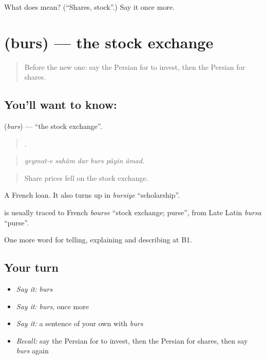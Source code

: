 \begin{tcolorbox}[breakable,colback=teal!4,colframe=teal!35!black,title={Before you move on}]
What does  mean? (\textquotedblleft{}Shares, stock\textquotedblright{}.) Say it once more.
\end{tcolorbox}
\section[\texorpdfstring{\fa{بورس} (burs)}{بورس (burs)}]{ (burs) — the stock exchange}

\label{lesson:FA-C412-burs}



\begin{quote}
Before the new one: say the Persian for to invest, then the Persian for shares.
\end{quote}

\subsection*{You'll want to know: }
\textbf{} (\emph{burs}) — \textquotedblleft{}the stock exchange\textquotedblright{}.

\begin{quote}
     .
\end{quote}

\begin{quote}
\emph{qeymat-e sahâm dar burs pâyin âmad.}
\end{quote}

\begin{quote}
Share prices fell on the stock exchange.
\end{quote}

A French loan. It also turns up in \emph{bursiye} \textquotedblleft{}scholarship\textquotedblright{}.

\begin{cousinweb}
\textbf{} is usually traced to French \emph{bourse} \textquotedblleft{}stock exchange; purse\textquotedblright{}, from Late Latin \emph{bursa} \textquotedblleft{}purse\textquotedblright{}.
\end{cousinweb}

\begin{grammarlens}[title={What you've built}]
One more word for telling, explaining and describing at B1.
\end{grammarlens}

\subsection*{Your turn}
\begin{itemize}
\raggedright
  \item \emph{Say it:} \emph{burs}
  \item \emph{Say it:} \emph{burs}, once more
  \item \emph{Say it:} a sentence of your own with \emph{burs}
  \item \emph{Recall:} say the Persian for to invest, then the Persian for shares, then say \emph{burs} again
\end{itemize}


